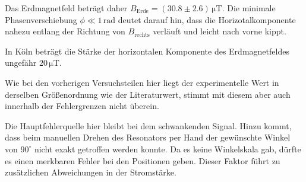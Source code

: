 \documentclass[12pt,a4paper]{scrartcl}
\numberwithin{equation}{section} %
\begin{document}
\noindent
Das Erdmagnetfeld beträgt daher $B_\mathrm{Erde} = (30.8 \pm 2.6) \mathrm{\,\mu T}$. Die minimale Phasenverschiebung $\phi \ll 1\mathrm{\,rad}$ deutet darauf hin, dass die Horizotalkomponente nahezu entlang der Richtung von $B_\mathrm{rechts}$ verläuft und leicht nach vorne kippt.

In Köln beträgt die Stärke der horizontalen Komponente des Erdmagnetfeldes ungefähr $20 \mathrm{\,\mu T}$. \cite{Erdmagnetfeld}

Wie bei den vorherigen Versuchsteilen hier liegt der experimentelle Wert in derselben Größenordnung wie der Literaturwert, stimmt mit diesem aber auch innerhalb der Fehlergrenzen nicht überein.

Die Hauptfehlerquelle hier bleibt bei dem schwankenden Signal. Hinzu kommt, dass beim manuellen Drehen des Resonators per Hand der gewünschte Winkel von $90^{\circ} $ nicht exakt getroffen werden konnte. Da es keine Winkelskala gab, dürfte es einen merkbaren Fehler bei den Positionen geben. Dieser Faktor führt zu zusätzlichen Abweichungen in der Stromstärke.
\end{document}

